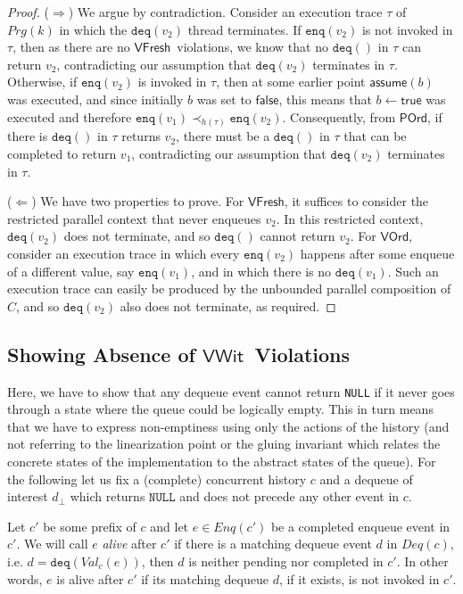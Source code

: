 \documentclass{LMCS}
\newcommand{\NULL}{\ensuremath{\mathtt{NULL}}}
\newcommand{\enq}{\ensuremath{\mathtt{enq}}}
\newcommand{\deq}{\ensuremath{\mathtt{deq}}}
\newcommand{\false}{\mathsf{false}}
\newcommand{\true}{\mathsf{true}}
\newcommand{\assume}{\mathsf{assume}}
\newcommand{\Prg}{\mathit{Prg}}
\newcommand{\Deq}[1]{\ensuremath{\mathit{Deq}({#1})}}
\newcommand{\Enq}[1]{\ensuremath{\mathit{Enq}({#1})}}
\newcommand{\Val}[2]{\ensuremath{\mathit{Val}_{#1}({#2})}}
\newcommand{\dhat}{\ensuremath{d_{\bot}}}
\newcommand{\VFresh}{\ensuremath{\mathsf{VFresh}}}
\newcommand{\VOrd}{\ensuremath{\mathsf{VOrd}}}
\newcommand{\VWit}{\ensuremath{\mathsf{VWit}}}
\newcommand{\POrd}{\ensuremath{\mathsf{POrd}}}
\begin{document}
\begin{proof}
($\Rightarrow$)
We argue by contradiction.
Consider an execution trace $\tau$ of $\Prg(k)$ in which the $\deq(v_2)$ thread terminates.
If $\enq(v_2)$ is not invoked in $\tau$, then as there are no \VFresh\ violations, 
we know that no $\deq()$ in $\tau$ can return $v_2$, 
contradicting our assumption that $\deq(v_2)$ terminates in $\tau$.
Otherwise, if $\enq(v_2)$ is invoked in $\tau$, then at some earlier point
$\assume(b)$ was executed, and since initially $b$ was set to $\false$,
this means that $b\gets\true$ was executed and therefore $\enq(v_1) \prec_{h(\tau)} \enq(v_2)$.
Consequently, from \POrd, if there is $\deq()$ in $\tau$ returns $v_2$, there must
be a $\deq()$ in $\tau$ that can be completed to return $v_1$, contradicting
our assumption that $\deq(v_2)$ terminates in $\tau$.

($\Leftarrow$) We have two properties to prove.
For \VFresh, it suffices to consider the restricted parallel context that
never enqueues $v_2$. In this restricted context,
$\deq(v_2)$ does not terminate, and so $\deq()$ cannot return $v_2$.
For \VOrd, consider an execution trace in which every $\enq(v_2)$ happens after
some enqueue of a different value, say $\enq(v_1)$, and in which there is no 
$\deq(v_1)$.  Such an execution trace can easily be produced by the unbounded parallel
composition of $C$, and so $\deq(v_2)$ also does not terminate, as required.
\end{proof}


\subsection*{Showing Absence of \VWit\ Violations}

Here, we have to show that any dequeue event cannot return \texttt{NULL} if it never goes through a state where the queue could be logically empty.
This in turn means that we have to express non-emptiness using only the actions of the history (and not referring to the linearization point or the gluing invariant which relates the concrete states of the implementation to the abstract states of the queue).
For the following let us fix a (complete) concurrent history $c$ and a dequeue of interest $\dhat$ which returns {\NULL} and does not precede any other event in $c$.

Let $c'$ be some prefix of $c$ and let $e\in \Enq{c'}$ be a completed enqueue event in $c'$.
We will call $e$ {\em alive} after $c'$ if there is a matching dequeue event $d$ in $\Deq c$, i.e. $d=\deq(\Val {c} e)$, 
then $d$ is neither pending nor completed in $c'$. 
In other words, $e$ is alive after $c'$ if its matching dequeue $d$, if it exists, is not invoked in $c'$.
\end{document}
